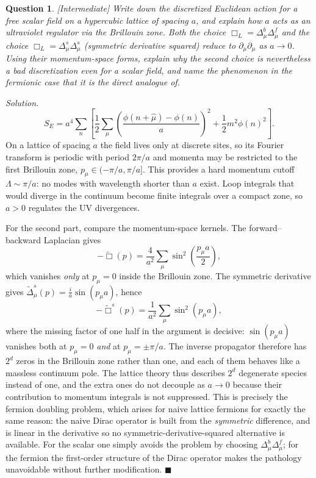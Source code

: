 \documentclass[11pt]{article}
\newcommand{\diff}[1]{\textcolor{blue!60!black}{\footnotesize\textsf{[#1]}}\quad}
\newtheorem{question}{Question}
\newenvironment{solution}{\par\smallskip\noindent\textit{Solution.}\ }{\hfill$\blacksquare$\par\smallskip}
\begin{document}
\begin{question}
\diff{Intermediate} Write down the discretized Euclidean action for a free scalar field on a hypercubic lattice of spacing $a$, and explain how $a$ acts as an ultraviolet regulator via the Brillouin zone.
Both the choice $\Box_L = \Delta^b_\mu\Delta^f_\mu$ and the choice $\Box_L = \Delta^s_\mu\Delta^s_\mu$ (symmetric derivative squared) reduce to $\partial_\mu\partial_\mu$ as $a\to 0$. Using their momentum-space forms, explain why the second choice is nevertheless a bad discretization even for a \emph{scalar} field, and name the phenomenon in the fermionic case that it is the direct analogue of.
\end{question}
\begin{solution}
\begin{equation}
S_E = a^4 \sum_n \left[ \frac{1}{2}\sum_\mu \left(\frac{\phi(n+\hat\mu)-\phi(n)}{a}\right)^2 + \frac{1}{2} m^2 \phi(n)^2 \right].
\end{equation}
On a lattice of spacing $a$ the field lives only at discrete sites, so its Fourier transform is periodic with period $2\pi/a$ and momenta may be restricted to the first Brillouin zone, $p_\mu \in (-\pi/a, \pi/a]$. This provides a hard momentum cutoff $\Lambda \sim \pi/a$: no modes with wavelength shorter than $a$ exist. Loop integrals that would diverge in the continuum become finite integrals over a compact zone, so $a>0$ regulates the UV divergences.

For the second part, compare the momentum-space kernels. The forward--backward Laplacian gives
\begin{equation}
-\widetilde{\Box}(p) = \frac{4}{a^2}\sum_\mu \sin^2\!\left(\frac{p_\mu a}{2}\right),
\end{equation}
which vanishes \emph{only} at $p_\mu = 0$ inside the Brillouin zone. The symmetric derivative gives $\tilde\Delta^s_\mu(p) = \tfrac{i}{a}\sin(p_\mu a)$, hence
\begin{equation}
-\widetilde{\Box}^s(p) = \frac{1}{a^2}\sum_\mu \sin^2(p_\mu a),
\end{equation}
where the missing factor of one half in the argument is decisive: $\sin(p_\mu a)$ vanishes both at $p_\mu = 0$ \emph{and} at $p_\mu = \pm\pi/a$. The inverse propagator therefore has $2^d$ zeros in the Brillouin zone rather than one, and each of them behaves like a massless continuum pole. The lattice theory thus describes $2^d$ degenerate species instead of one, and the extra ones do not decouple as $a\to0$ because their contribution to momentum integrals is not suppressed. This is precisely the fermion doubling problem, which arises for naive lattice fermions for exactly the same reason: the naive Dirac operator is built from the \emph{symmetric} difference, and is linear in the derivative so no symmetric-derivative-squared alternative is available. For the scalar one simply avoids the problem by choosing $\Delta^b_\mu\Delta^f_\mu$; for the fermion the first-order structure of the Dirac operator makes the pathology unavoidable without further modification.
\end{solution}
\end{document}
